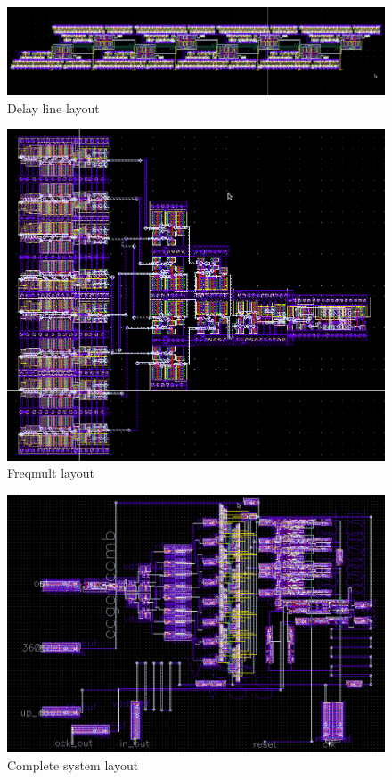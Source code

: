 \documentclass[a4paper,12pt]{article} \usepackage{graphicx}
\begin{document}
\begin{figure}[h]
  \centering
  \includegraphics[width=1.0\textwidth]{../Bilder/Layout/delay_line_trans.png}
  \caption{Delay line layout}
  \label{fig:delay_final}
\end{figure}

\begin{figure}[h]
  \centering
  \includegraphics[width=1.0\textwidth]{../Bilder/Layout/freq_mult_tpl.png}
  \caption{Freqmult layout}
  \label{fig:freq_mult_final}
\end{figure}

\begin{figure}[h]
  \centering
  \includegraphics[width=1.0\textwidth]{../Bilder/Layout/complete_system.png}
  \caption{Complete system layout}
  \label{fig:complete_system_final}
\end{figure}
\end{document}
